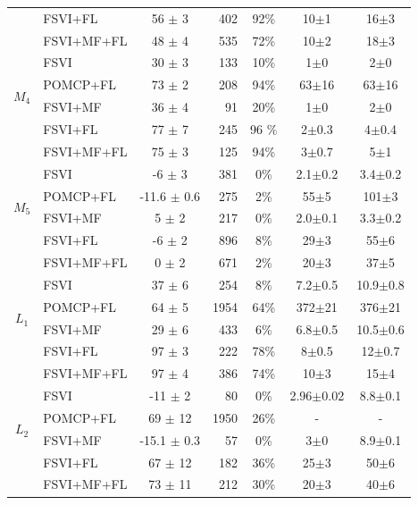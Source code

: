 \documentclass[letterpaper]{article} %
\newcommand{\itay}[1]{}
\begin{document}
\begin{table}
{\begin{tabular}{ |c|l|c|r|c|c|c| }
    &FSVI+FL\itay{+} & 56 $\pm$ 3 & 402 & 92\% & 10$\pm$1 & 16$\pm$3 \\
    & FSVI+MF+FL\itay{+} & 48 $\pm$ 4 & 535 & 72\% & 10$\pm$2 & 18$\pm$3 \\
    \hline\hline
    \multirow{4}{*}{$M_4$}
    & FSVI\itay{+} & 30 $\pm$ 3 & 133 & 10\% & 1$\pm$0 & 2$\pm$0 \\
    & POMCP+FL\itay{+} & 73 $\pm$ 2 & 208 & 94\% & 63$\pm$16 & 63$\pm$16 \\
    & FSVI+MF\itay{+} & 36 $\pm$ 4 & 91 & 20\% & 1$\pm$0 & 2$\pm$0 \\
    &FSVI+FL\itay{+} & 77 $\pm$ 7 & 245 & 96 \% & 2$\pm$0.3 & 4$\pm$0.4 \\
    & FSVI+MF+FL\itay{+} & 75 $\pm$ 3 & 125 & 94\% & 3$\pm$0.7 & 5$\pm$1 \\
    \hline\hline
    \multirow{4}{*}{$M_5$}
    & FSVI\itay{+} & -6 $\pm$ 3 & 381 & 0\% & 2.1$\pm$0.2 & 3.4$\pm$0.2 \\
    & POMCP+FL\itay{+} & -11.6 $\pm$ 0.6 & 275 & 2\% & 55$\pm$5 & 101$\pm$3 \\
    & FSVI+MF\itay{+} & 5 $\pm$ 2 & 217 & 0\% & 2.0$\pm$0.1 & 3.3$\pm$0.2 \\
    &FSVI+FL\itay{+} & -6 $\pm$ 2 & 896 & 8\% & 29$\pm$3 & 55$\pm$6 \\
    & FSVI+MF+FL\itay{+} & 0 $\pm$ 2 & 671 & 2\% & 20$\pm$3 & 37$\pm$5 \\
    \hline\hline
    \multirow{4}{*}{$L_1$}
    & FSVI\itay{+} & 37 $\pm$ 6 & 254 & 8\% &  7.2$\pm$0.5 & 10.9$\pm$0.8 \\
    & POMCP+FL\itay{+} & 64 $\pm$ 5 & 1954 & 64\% &  372$\pm$21 & 376$\pm$21 \\
    & FSVI+MF\itay{+} & 29 $\pm$ 6 & 433 & 6\% &  6.8$\pm$0.5 & 10.5$\pm$0.6 \\
    &FSVI+FL\itay{+} & 97 $\pm$ 3 & 222 & 78\% &  8$\pm$0.5 & 12$\pm$0.7 \\
    & FSVI+MF+FL\itay{+} & 97 $\pm$ 4 & 386 & 74\% &  10$\pm$3 & 15$\pm$4 \\
    \hline\hline
    \multirow{4}{*}{$L_2$}
    & FSVI\itay{+} & -11 $\pm$ 2 & 80 & 0\% &  2.96$\pm$0.02 & 8.8$\pm$0.1 \\
    & POMCP+FL\itay{-} & 69 $\pm$ 12 & 1950 & 26\% &  - & - \\
    & FSVI+MF\itay{+} & -15.1 $\pm$ 0.3 & 57 & 0\% &  3$\pm$0 & 8.9$\pm$0.1 \\
    &FSVI+FL\itay{+} & 67 $\pm$ 12 & 182 & 36\% &  25$\pm$3 & 50$\pm$6 \\
    & FSVI+MF+FL\itay{+} & 73 $\pm$ 11 & 212 & 30\% & 20$\pm$3 & 40$\pm$6 \\

\end{tabular}}
\end{table}
\end{document}

